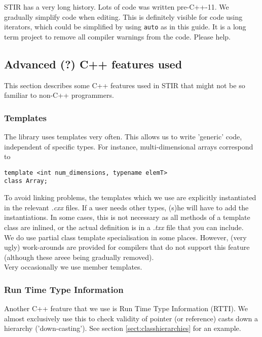 \documentclass{article}
\begin{document}
STIR has a very long history. Lots of code was written pre-C++-11. We gradually simplify
code when editing. This is definitely visible for code using iterators, which could be
simplified by using \texttt{auto} as in this guide. It is a long term project to
remove all compiler warnings from the code. Please help.

\subsection{\label{ssect:AdvancedCppFeatures}
Advanced (?) C++ features used}


This section describes some C++ features used in STIR that might not be so familiar to
non-C++ programmers.

\subsubsection{Templates}
The library uses templates very often. This allows us to write 
'generic' code, independent of specific types. For instance, 
multi-dimensional arrays correspond to 

\begin{verbatim}
template <int num_dimensions, typename elemT>
class Array;
\end{verbatim}


To avoid linking problems, the templates which we use are explicitly 
instantiated in the relevant \textit{.cxx} files. If a user needs 
other types, (s)he will have to add the instantiations. In some cases,
this is not necessary as all methods of a template class are inlined, or the
actual definition is in a \textit{.txx} file that you can include.\\
We do use partial class template specialisation in some places. 
However, (very ugly) work-arounds are provided for compilers 
that do not support this feature (although these areee being gradually removed).\\
Very occasionally we use member templates. 

\subsubsection{Run Time Type Information}
Another C++ feature that we use is Run Time Type 
Information (RTTI). We almost exclusively use this to check validity 
of pointer (or reference) casts down a hierarchy ('down-casting'). 
See section \ref{sect:classhierarchies} 
for an example.
\end{document}
